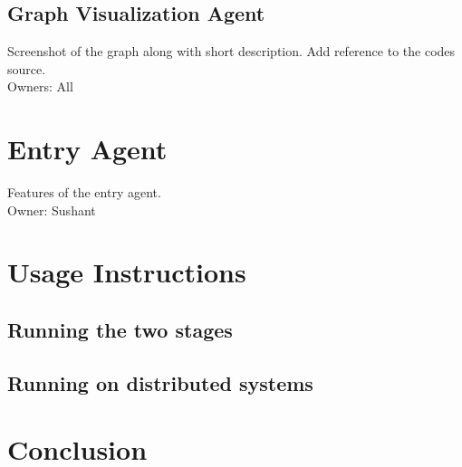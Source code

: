 \documentclass[11pt, a4paper]{article}
\begin{document}
\subsection{Graph Visualization Agent}
Screenshot of the graph along with short description. Add reference to the codes source. 
\\Owners: All

\section{Entry Agent}
Features of the entry agent.\\
Owner: Sushant

\section{Usage Instructions}

\subsection{Running the two stages}

\subsection{Running on distributed systems}

\section{Conclusion}
\end{document}
